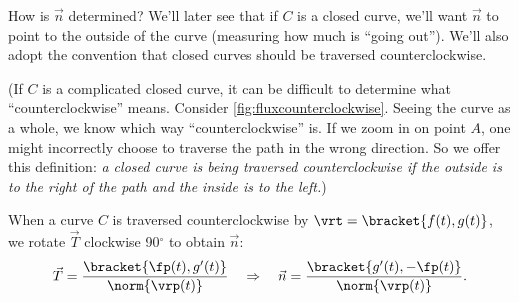 %

How is $\vec n$ determined? We'll later see that if $C$ is a closed curve, we'll want $\vec n$ to point to the outside of the curve (measuring how much is ``going out''). We'll also adopt the convention that closed curves should be traversed counterclockwise. 


(If $C$ is a complicated closed curve, it can be difficult to determine what ``counterclockwise'' means. Consider \autoref{fig:fluxcounterclockwise}. Seeing the curve as a whole, we know which way ``counterclockwise'' is. If we zoom in on point $A$, one might incorrectly choose to traverse the path in the wrong direction. So we offer this definition: \textit{a closed curve is being traversed counterclockwise if the outside is to the right of the path and the inside is to the left.})

When a curve $C$ is traversed counterclockwise by $\vrt =\bracket{f(t), g(t)}$, we rotate $\vec T$ clockwise 90$^\circ$  to obtain $\vec n$:
\[
\vec T = \frac{\bracket{\fp(t),g'(t)}}{\norm{\vrp(t)}} \quad \Rightarrow \quad \vec n = \frac{\bracket{g'(t),-\fp(t)}}{\norm{\vrp(t)}}.
\]

